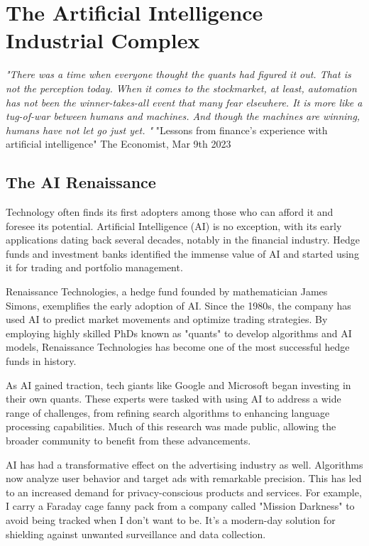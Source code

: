 \setchapterpreamble[u]{\margintoc}
\chapter{The Artificial Intelligence Industrial Complex}

\textit{"There was a time when everyone thought the quants had figured it out. That is not the perception today. When it comes to the stockmarket, at least, automation has not been the winner-takes-all event that many fear elsewhere. It is more like a tug-of-war between humans and machines. And though the machines are winning, humans have not let go just yet. "} "Lessons from finance's experience with artificial intelligence" The Economist, Mar 9th 2023 \cite{finaieconomist}


\section{The AI Renaissance}

Technology often finds its first adopters among those who can afford it and foresee its potential. Artificial Intelligence (AI) is no exception, with its early applications dating back several decades, notably in the financial industry. Hedge funds and investment banks identified the immense value of AI and started using it for trading and portfolio management.

Renaissance Technologies, a hedge fund founded by mathematician James Simons, exemplifies the early adoption of AI. Since the 1980s, the company has used AI to predict market movements and optimize trading strategies. By employing highly skilled PhDs known as "quants" to develop algorithms and AI models, Renaissance Technologies has become one of the most successful hedge funds in history.

As AI gained traction, tech giants like Google and Microsoft began investing in their own quants. These experts were tasked with using AI to address a wide range of challenges, from refining search algorithms to enhancing language processing capabilities. Much of this research was made public, allowing the broader community to benefit from these advancements.

AI has had a transformative effect on the advertising industry as well. Algorithms now analyze user behavior and target ads with remarkable precision. This has led to an increased demand for privacy-conscious products and services. For example, I carry a Faraday cage fanny pack from a company called "Mission Darkness" to avoid being tracked when I don't want to be. It's a modern-day solution for shielding against unwanted surveillance and data collection.

